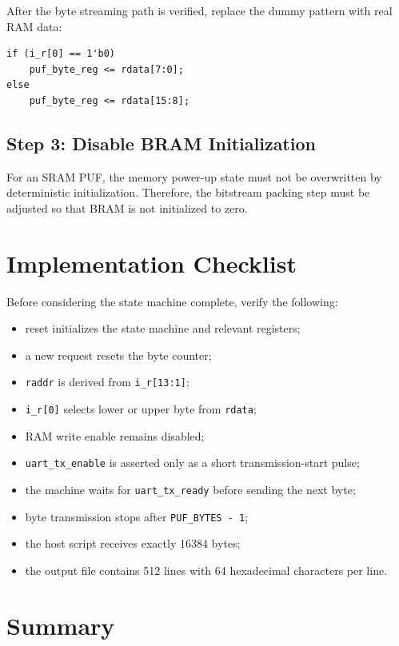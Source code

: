 \documentclass[11pt,a4paper]{article}
\begin{document}
After the byte streaming path is verified, replace the dummy pattern with real RAM data:

\begin{lstlisting}
if (i_r[0] == 1'b0)
    puf_byte_reg <= rdata[7:0];
else
    puf_byte_reg <= rdata[15:8];
\end{lstlisting}

\subsection{Step 3: Disable BRAM Initialization}

For an SRAM PUF, the memory power-up state must not be overwritten by deterministic initialization. Therefore, the bitstream packing step must be adjusted so that BRAM is not initialized to zero.

\section{Implementation Checklist}

Before considering the state machine complete, verify the following:

\begin{itemize}
  \item reset initializes the state machine and relevant registers;
  \item a new request resets the byte counter;
  \item \texttt{raddr} is derived from \texttt{i\_r[13:1]};
  \item \texttt{i\_r[0]} selects lower or upper byte from \texttt{rdata};
  \item RAM write enable remains disabled;
  \item \texttt{uart\_tx\_enable} is asserted only as a short transmission-start pulse;
  \item the machine waits for \texttt{uart\_tx\_ready} before sending the next byte;
  \item byte transmission stops after \texttt{PUF\_BYTES - 1};
  \item the host script receives exactly 16384 bytes;
  \item the output file contains 512 lines with 64 hexadecimal characters per line.
\end{itemize}

\section{Summary}
\end{document}
